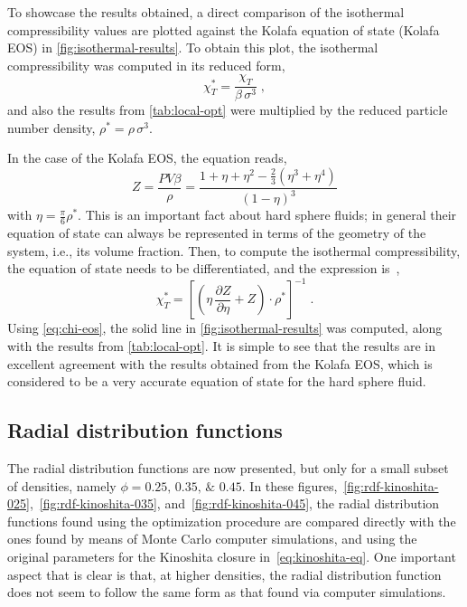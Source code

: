 To showcase the results obtained, a direct comparison of the isothermal compressibility 
values are plotted against the Kolafa equation of state (Kolafa EOS) in 
\autoref{fig:isothermal-results}. To obtain this plot, the isothermal compressibility was 
computed in its reduced form,
\begin{equation}
    \chi_{T}^{*} =  \frac{\chi_{T}}{\beta \, \sigma^3}
    \; ,
    \label{eq:reduced-chi}
\end{equation}
and also the results from \autoref{tab:local-opt} were multiplied by the reduced particle 
number density, \(\rho^{*} = \rho \, \sigma^3 .\)

In the case of the Kolafa EOS, the equation reads,
\begin{equation}
    Z = \frac{P V \beta}{\rho} = \frac{1 + \eta + \eta^2 - \frac{2}{3} (\eta^3 + \eta^4)}{{\left(1 - \eta\right)}^{3}}
    \label{eq:kolafa}
\end{equation}
with \(\eta = \frac{\pi}{6} \rho^{*} .\) This is an important fact about hard sphere 
fluids; in general their equation of state can always be represented in terms of the 
geometry of the system, i.e., its volume fraction.
Then, to compute the isothermal compressibility, the equation of state needs to be 
differentiated, and the expression is~\cite{liuCarnahanStarlingTypeEquations2021},
\begin{equation}
    \chi_{T}^{*} = {\left[\left(\eta \, \frac{\partial Z}{\partial \eta} + Z\right) \cdot \rho^{*}\right]}^{-1}
    \; .
    \label{eq:chi-eos}
\end{equation}
Using \autoref{eq:chi-eos}, the solid line in \autoref{fig:isothermal-results} was 
computed, along with the results from \autoref{tab:local-opt}. It is simple to see that the 
results are in excellent agreement with the results obtained from the Kolafa EOS, which is 
considered to be a very accurate equation of state for the hard sphere fluid.

\subsection{Radial distribution functions}
The radial distribution functions are now presented, but only for a small subset of 
densities, namely 
\(\phi=\numlist[list-final-separator={\enspace\text{and}\enspace}]{0.25; 0.35; 0.45} .\)
In these figures,~\autoref{fig:rdf-kinoshita-025},~\autoref{fig:rdf-kinoshita-035}, 
and~\autoref{fig:rdf-kinoshita-045}, the radial distribution functions found using the 
optimization procedure are compared directly with the ones found by means of Monte Carlo 
computer simulations, and using the original parameters for the Kinoshita closure 
in~\autoref{eq:kinoshita-eq}. One important aspect that is clear is that, at higher 
densities, the radial distribution function does not seem to follow the same form as that 
found via computer simulations.

